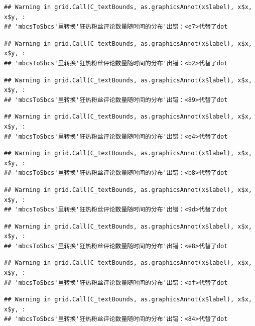 \documentclass[
]{article}
\begin{document}
\begin{verbatim}
## Warning in grid.Call(C_textBounds, as.graphicsAnnot(x$label), x$x, x$y, :
## 'mbcsToSbcs'里转换'狂热粉丝评论数量随时间的分布'出错：<e7>代替了dot
\end{verbatim}

\begin{verbatim}
## Warning in grid.Call(C_textBounds, as.graphicsAnnot(x$label), x$x, x$y, :
## 'mbcsToSbcs'里转换'狂热粉丝评论数量随时间的分布'出错：<b2>代替了dot
\end{verbatim}

\begin{verbatim}
## Warning in grid.Call(C_textBounds, as.graphicsAnnot(x$label), x$x, x$y, :
## 'mbcsToSbcs'里转换'狂热粉丝评论数量随时间的分布'出错：<89>代替了dot
\end{verbatim}

\begin{verbatim}
## Warning in grid.Call(C_textBounds, as.graphicsAnnot(x$label), x$x, x$y, :
## 'mbcsToSbcs'里转换'狂热粉丝评论数量随时间的分布'出错：<e4>代替了dot
\end{verbatim}

\begin{verbatim}
## Warning in grid.Call(C_textBounds, as.graphicsAnnot(x$label), x$x, x$y, :
## 'mbcsToSbcs'里转换'狂热粉丝评论数量随时间的分布'出错：<b8>代替了dot
\end{verbatim}

\begin{verbatim}
## Warning in grid.Call(C_textBounds, as.graphicsAnnot(x$label), x$x, x$y, :
## 'mbcsToSbcs'里转换'狂热粉丝评论数量随时间的分布'出错：<9d>代替了dot
\end{verbatim}

\begin{verbatim}
## Warning in grid.Call(C_textBounds, as.graphicsAnnot(x$label), x$x, x$y, :
## 'mbcsToSbcs'里转换'狂热粉丝评论数量随时间的分布'出错：<e8>代替了dot
\end{verbatim}

\begin{verbatim}
## Warning in grid.Call(C_textBounds, as.graphicsAnnot(x$label), x$x, x$y, :
## 'mbcsToSbcs'里转换'狂热粉丝评论数量随时间的分布'出错：<af>代替了dot
\end{verbatim}

\begin{verbatim}
## Warning in grid.Call(C_textBounds, as.graphicsAnnot(x$label), x$x, x$y, :
## 'mbcsToSbcs'里转换'狂热粉丝评论数量随时间的分布'出错：<84>代替了dot
\end{verbatim}
\end{document}
